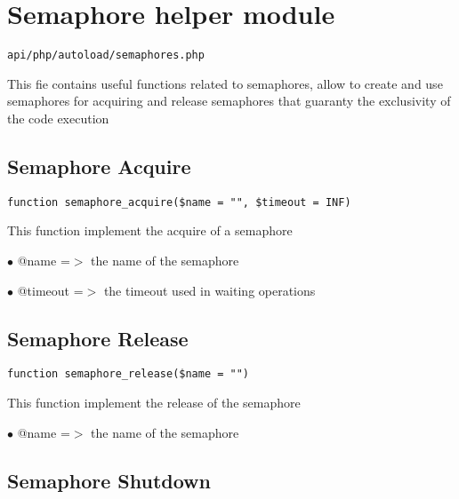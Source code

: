 \documentclass[a4paper]{book}
\begin{document}
\hypertarget{toc230}{}
\section{Semaphore helper module}

\begin{lstlisting}
api/php/autoload/semaphores.php
\end{lstlisting}

This fie contains useful functions related to semaphores, allow to create and use semaphores
for acquiring and release semaphores that guaranty the exclusivity of the code execution

\hypertarget{toc231}{}
\subsection{Semaphore Acquire}

\begin{lstlisting}
function semaphore_acquire($name = "", $timeout = INF)
\end{lstlisting}

This function implement the acquire of a semaphore

\begin{compactitem}
\item[\color{myblue}$\bullet$] @name    =$>$ the name of the semaphore
\item[\color{myblue}$\bullet$] @timeout =$>$ the timeout used in waiting operations
\end{compactitem}

\hypertarget{toc232}{}
\subsection{Semaphore Release}

\begin{lstlisting}
function semaphore_release($name = "")
\end{lstlisting}

This function implement the release of the semaphore

\begin{compactitem}
\item[\color{myblue}$\bullet$] @name =$>$ the name of the semaphore
\end{compactitem}

\hypertarget{toc233}{}
\subsection{Semaphore Shutdown}
\end{document}
